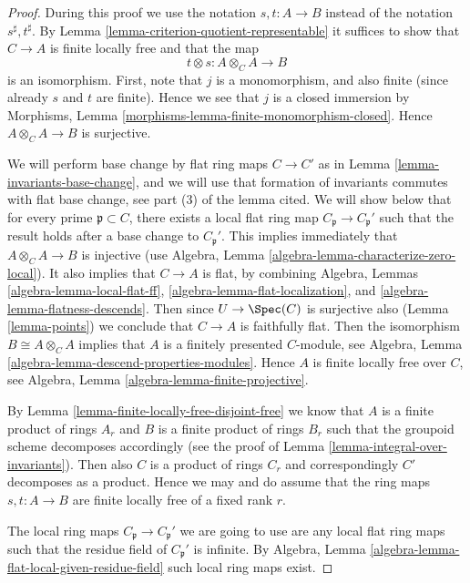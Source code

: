 \begin{proof}
During this proof we use the notation $s, t : A \to B$
instead of the notation $s^\sharp, t^\sharp$.
By Lemma \ref{lemma-criterion-quotient-representable}
it suffices to show that $C \to A$ is finite locally free
and that the map
$$
t \otimes s : A \otimes_C A \longrightarrow B
$$
is an isomorphism. First, note that $j$ is a monomorphism, and
also finite (since already $s$ and $t$ are finite). Hence we see
that $j$ is a closed immersion by
Morphisms, Lemma \ref{morphisms-lemma-finite-monomorphism-closed}.
Hence $A \otimes_C A \to B$ is surjective.

\medskip\noindent
We will perform base change by flat ring maps $C \to C'$ as in
Lemma \ref{lemma-invariants-base-change}, and we will use that
formation of invariants commutes with flat base change, see
part (3) of the lemma cited.
We will show below that for every prime $\mathfrak p \subset C$, there exists
a local flat ring map $C_{\mathfrak p} \to C_{\mathfrak p}'$
such that the result holds after a base change to $C_{\mathfrak p}'$.
This implies immediately
that $A \otimes_C A \to B$ is injective (use
Algebra, Lemma \ref{algebra-lemma-characterize-zero-local}).
It also implies that $C \to A$ is flat, by combining
Algebra, Lemmas \ref{algebra-lemma-local-flat-ff},
\ref{algebra-lemma-flat-localization}, and
\ref{algebra-lemma-flatness-descends}. Then since $U \to \Spec(C)$
is surjective also (Lemma \ref{lemma-points}) we conclude that $C \to A$
is faithfully flat. Then the isomorphism $B \cong A \otimes_C A$
implies that $A$ is a finitely presented $C$-module, see
Algebra, Lemma \ref{algebra-lemma-descend-properties-modules}.
Hence $A$ is finite locally free over $C$, see
Algebra, Lemma \ref{algebra-lemma-finite-projective}.

\medskip\noindent
By Lemma \ref{lemma-finite-locally-free-disjoint-free}
we know that $A$ is a finite
product of rings $A_r$ and $B$ is a finite product of rings $B_r$
such that the groupoid scheme decomposes accordingly (see the proof
of Lemma \ref{lemma-integral-over-invariants}).
Then also $C$ is a product of rings $C_r$ and
correspondingly $C'$ decomposes as a product. Hence we may and do
assume that the ring maps $s, t : A \to B$ are finite
locally free of a fixed rank $r$.

\medskip\noindent
The local ring maps $C_{\mathfrak p} \to C_{\mathfrak p}'$ we are going
to use are any local flat ring maps such that the residue field of
$C_{\mathfrak p}'$ is infinite.
By Algebra, Lemma \ref{algebra-lemma-flat-local-given-residue-field}
such local ring maps exist.


\end{proof}
